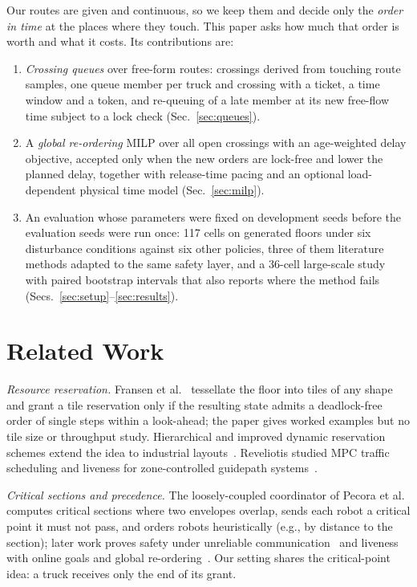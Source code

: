 \documentclass[conference]{IEEEtran}
\begin{document}
Our routes are given and continuous, so we keep them and decide only the
\emph{order in time} at the places where they touch. This paper asks how much
that order is worth and what it costs. Its contributions are:
\begin{enumerate}
\item \emph{Crossing queues} over free-form routes: crossings derived from
  touching route samples, one queue member per truck and crossing with a
  ticket, a time window and a token, and re-queuing of a late member at its
  new free-flow time subject to a lock check (Sec.~\ref{sec:queues}).
\item A \emph{global re-ordering} MILP over all open crossings with an
  age-weighted delay objective, accepted only when the new orders are
  lock-free and lower the planned delay, together with release-time pacing and
  an optional load-dependent physical time model (Sec.~\ref{sec:milp}).
\item An evaluation whose parameters were fixed on development seeds before
  the evaluation seeds were run once: 117 cells on generated floors under six
  disturbance conditions against six other policies, three of them literature
  methods adapted to the same safety layer, and a 36-cell large-scale study
  with paired bootstrap intervals that also reports where the method fails
  (Secs.~\ref{sec:setup}--\ref{sec:results}).
\end{enumerate}

\section{Related Work}

\emph{Resource reservation.} Fransen et al.~\cite{fransen2022} tessellate the
floor into tiles of any shape and grant a tile reservation only if the
resulting state admits a deadlock-free order of single steps within a
look-ahead; the paper gives worked examples but no tile size or throughput
study. Hierarchical and improved dynamic reservation schemes extend the idea
to industrial layouts~\cite{pratissoli2024,verma2024,digani2015}. Reveliotis
studied MPC traffic scheduling and liveness for zone-controlled guidepath
systems~\cite{reveliotis2018,reveliotis2019}.

\emph{Critical sections and precedence.} The loosely-coupled coordinator of
Pecora et al.~\cite{pecora2018} computes critical sections where two
envelopes overlap, sends each robot a critical point it must not pass, and
orders robots heuristically (e.g., by distance to the section); later work
proves safety under unreliable communication~\cite{mannucci2019} and liveness
with online goals and global re-ordering~\cite{mannucci2021}. Our setting
shares the critical-point idea: a truck receives only the end of its grant.
\end{document}
